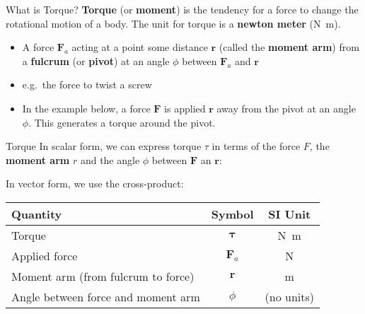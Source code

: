 \documentclass[12pt,compress,aspectratio=169]{beamer}
\newcommand{\eq}[2]{\vspace{#1}{\Large\begin{displaymath}#2\end{displaymath}}}
\begin{document}
\begin{frame}{What is Torque?}
  \textbf{Torque} (or \textbf{moment}) is the tendency for a force to change
  the rotational motion of a body. The unit for torque is a
  \textbf{newton meter} (\si{\newton\metre}).
  \begin{itemize}
  \item A force $\bm{F}_a$ acting at a point some distance $\bm{r}$ (called the
    \textbf{moment arm}) from a \textbf{fulcrum} (or \textbf{pivot}) at an angle
    $\phi$ between $\bm{F}_a$ and $\bm{r}$
  \item e.g.\ the force to twist a screw
  \item In the example below, a force $\bm{F}$ is applied $\bm{r}$ away from
    the pivot at an angle $\phi$. This generates a torque around the pivot.
  \end{itemize}
  \begin{center}
  \end{center}
\end{frame}



\begin{frame}{Torque}
  In scalar form, we can express torque $\tau$ in terms of the force $F$,
  the \textbf{moment arm} $r$ and the angle $\phi$ between $\bm{F}$ an $\bm{r}$:

  \eq{-.2in}{
    \boxed{\tau=rF\sin\phi}
  }
  
  In vector form, we use the cross-product:

  \eq{-.2in}{
    \boxed{\bm{\tau}=\bm{r}\times\bm{F}_a}
  }
  \begin{center}
    \begin{tabular}{l|c|c}
      \rowcolor{pink}
      \textbf{Quantity} & \textbf{Symbol} & \textbf{SI Unit} \\ \hline
      Torque        & $\bm{\tau}$ & \si{\newton\metre} \\
      Applied force & $\bm{F}_a$  & \si\newton \\
      Moment arm (from fulcrum to force) & $\bm{r}$ & \si\metre \\
      Angle between force and moment arm & $\phi$ & (no units)
    \end{tabular}
  \end{center}
\end{frame}
\end{document}

